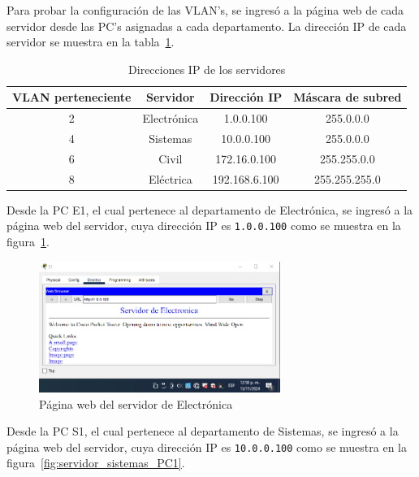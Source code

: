         Para probar la configuración de las VLAN's, se ingresó a la página web de cada servidor desde las PC's asignadas a cada departamento. La dirección IP de cada servidor se muestra en la tabla~\ref{tab:IPs}.

        \begin{table}[H]
            \begin{center}
                \begin{tabular}{ c | c | c | c }
                    \textbf{VLAN perteneciente} & \textbf{Servidor} & \textbf{Dirección IP} & \textbf{Máscara de subred}\\ \hline
                    2 & Electrónica & 1.0.0.100 & 255.0.0.0\\
                    4 & Sistemas & 10.0.0.100 & 255.0.0.0\\
                    6 & Civil & 172.16.0.100 & 255.255.0.0\\
                    8 & Eléctrica & 192.168.6.100 & 255.255.255.0\\
                \end{tabular}
                \caption{Direcciones IP de los servidores}
                \label{tab:IPs}
                \end{center}
        \end{table}

        Desde la PC E1, el cual pertenece al departamento de Electrónica, se ingresó a la página web del servidor, cuya dirección IP es \texttt{1.0.0.100} como se muestra en la figura~\ref{fig:servidor_electronica_PC1}.

        \begin{figure}[H]
            \centering
            \includegraphics[width=0.7\textwidth]{img/servidor_electronica_PC1.png}
            \caption{Página web del servidor de Electrónica}
            \label{fig:servidor_electronica_PC1}
        \end{figure}

        Desde la PC S1, el cual pertenece al departamento de Sistemas, se ingresó a la página web del servidor, cuya dirección IP es \texttt{10.0.0.100} como se muestra en la figura~\ref{fig:servidor_sistemas_PC1}.

